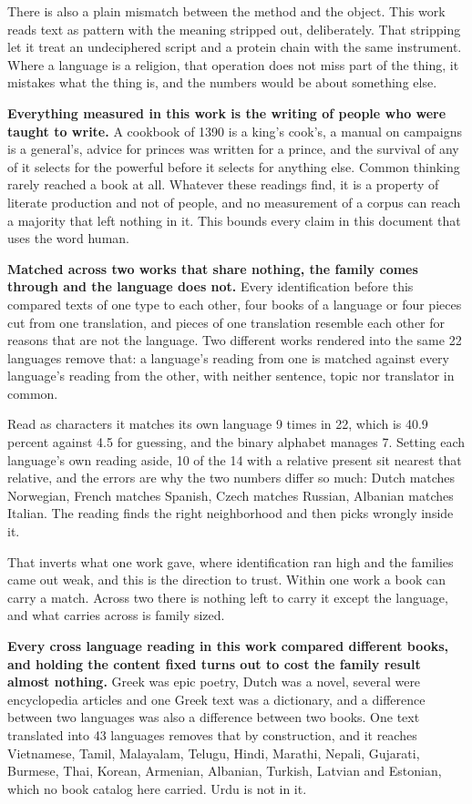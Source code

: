 There is also a plain mismatch between the method and the object. This work reads text as pattern with the meaning stripped out, deliberately. That stripping let it treat an undeciphered script and a protein chain with the same instrument. Where a language is a religion, that operation does not miss part of the thing, it mistakes what the thing is, and the numbers would be about something else.

\textbf{Everything measured in this work is the writing of people who were taught to write.} A cookbook of 1390 is a king's cook's, a manual on campaigns is a general's, advice for princes was written for a prince, and the survival of any of it selects for the powerful before it selects for anything else. Common thinking rarely reached a book at all. Whatever these readings find, it is a property of literate production and not of people, and no measurement of a corpus can reach a majority that left nothing in it. This bounds every claim in this document that uses the word human.

\textbf{Matched across two works that share nothing, the family comes through and the language does not.} Every identification before this compared texts of one type to each other, four books of a language or four pieces cut from one translation, and pieces of one translation resemble each other for reasons that are not the language. Two different works rendered into the same 22 languages remove that: a language's reading from one is matched against every language's reading from the other, with neither sentence, topic nor translator in common.

Read as characters it matches its own language 9 times in 22, which is 40.9 percent against 4.5 for guessing, and the binary alphabet manages 7. Setting each language's own reading aside, 10 of the 14 with a relative present sit nearest that relative, and the errors are why the two numbers differ so much: Dutch matches Norwegian, French matches Spanish, Czech matches Russian, Albanian matches Italian. The reading finds the right neighborhood and then picks wrongly inside it.

That inverts what one work gave, where identification ran high and the families came out weak, and this is the direction to trust. Within one work a book can carry a match. Across two there is nothing left to carry it except the language, and what carries across is family sized.

\textbf{Every cross language reading in this work compared different books, and holding the content fixed turns out to cost the family result almost nothing.} Greek was epic poetry, Dutch was a novel, several were encyclopedia articles and one Greek text was a dictionary, and a difference between two languages was also a difference between two books. One text translated into 43 languages removes that by construction, and it reaches Vietnamese, Tamil, Malayalam, Telugu, Hindi, Marathi, Nepali, Gujarati, Burmese, Thai, Korean, Armenian, Albanian, Turkish, Latvian and Estonian, which no book catalog here carried. Urdu is not in it.

